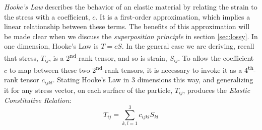 \documentclass[a4paper,10pt]{report}
\numberwithin{equation}{section}
\begin{document}
\emph{Hooke's Law} describes the behavior of an elastic material by relating the strain
to the stress with a coefficient, $c$. It is a first-order approximation, which implies a linear relationship between these terms. The benefits of this approximation will be made clear when we discuss the \emph{superposition principle} in section \ref{sec:lossy}. In one dimension, Hooke's Law is $T = cS$. In the general case we are deriving, recall that stress, $T_{ij}$, is a 2\textsuperscript{nd}-rank tensor, and so is strain, $S_{ij}$. To allow the coefficient $c$ to map between these two 2\textsuperscript{nd}-rank tensors, it is necessary to invoke it as a 4\textsuperscript{th}-rank tensor $c_{ijkl}$. Stating Hooke's Law in 3 dimensions this way, and generalizing it for any stress vector, on each surface of the particle, $T_{ij}$, produces the \emph{Elastic Constitutive Relation}\cite[p.~542]{Kino1987}:
\begin{equation}\label{ecrelation}
 T_{ij} = \sum_{k,l=1}^3 c_{ijkl} S_{kl}
\end{equation}
\end{document}
